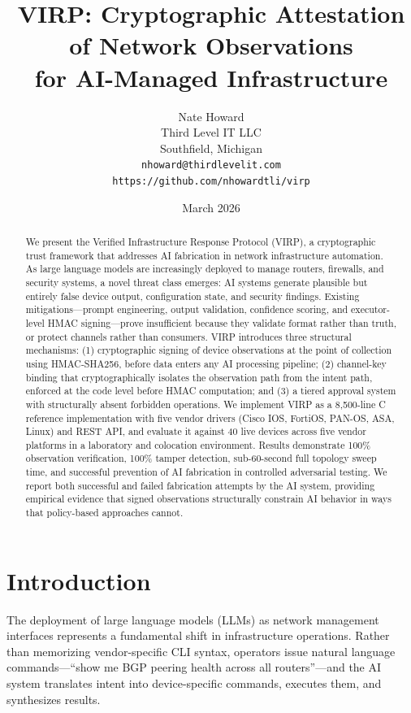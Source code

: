 \documentclass[11pt,twocolumn]{article}
\title{\Large\textbf{VIRP: Cryptographic Attestation of Network Observations\\for AI-Managed Infrastructure}}
\author{
    Nate Howard\\
    Third Level IT LLC\\
    Southfield, Michigan\\
    \texttt{nhoward@thirdlevelit.com}\\
    \texttt{https://github.com/nhowardtli/virp}
}
\date{March 2026}
\begin{document}
\maketitle

\begin{abstract}
We present the Verified Infrastructure Response Protocol (VIRP), a cryptographic trust framework that addresses AI fabrication in network infrastructure automation. As large language models are increasingly deployed to manage routers, firewalls, and security systems, a novel threat class emerges: AI systems generate plausible but entirely false device output, configuration state, and security findings. Existing mitigations---prompt engineering, output validation, confidence scoring, and executor-level HMAC signing---prove insufficient because they validate format rather than truth, or protect channels rather than consumers. VIRP introduces three structural mechanisms: (1) cryptographic signing of device observations at the point of collection using HMAC-SHA256, before data enters any AI processing pipeline; (2) channel-key binding that cryptographically isolates the observation path from the intent path, enforced at the code level before HMAC computation; and (3) a tiered approval system with structurally absent forbidden operations. We implement VIRP as a 8,500-line C reference implementation with five vendor drivers (Cisco IOS, FortiOS, PAN-OS, ASA, Linux) and REST API, and evaluate it against 40 live devices across five vendor platforms in a laboratory and colocation environment. Results demonstrate 100\% observation verification, 100\% tamper detection, sub-60-second full topology sweep time, and successful prevention of AI fabrication in controlled adversarial testing. We report both successful and failed fabrication attempts by the AI system, providing empirical evidence that signed observations structurally constrain AI behavior in ways that policy-based approaches cannot.
\end{abstract}

\section{Introduction}

The deployment of large language models (LLMs) as network management interfaces represents a fundamental shift in infrastructure operations. Rather than memorizing vendor-specific CLI syntax, operators issue natural language commands---``show me BGP peering health across all routers''---and the AI system translates intent into device-specific commands, executes them, and synthesizes results.
\end{document}
